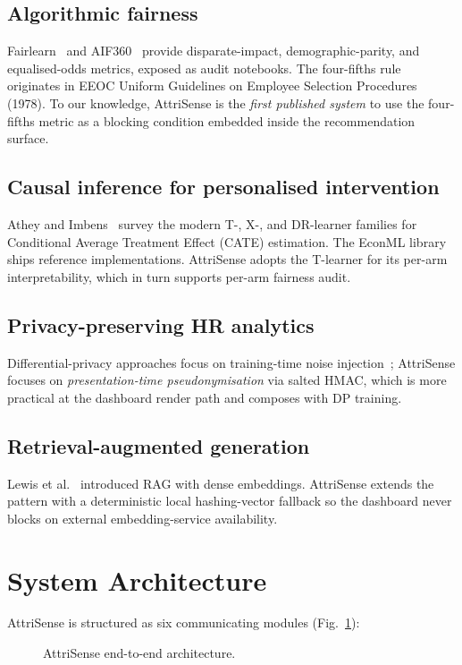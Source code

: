 \documentclass[conference]{IEEEtran}
\begin{document}
\subsection{Algorithmic fairness}
Fairlearn~\cite{fairlearn2018} and AIF360~\cite{aif360} provide
disparate-impact, demographic-parity, and equalised-odds metrics, exposed as
audit notebooks. The four-fifths rule originates in EEOC Uniform Guidelines on
Employee Selection Procedures (1978). To our knowledge, AttriSense is the
\emph{first published system} to use the four-fifths metric as a blocking
condition embedded inside the recommendation surface.

\subsection{Causal inference for personalised intervention}
Athey and Imbens~\cite{athey2019cate} survey the modern T-, X-, and DR-learner
families for Conditional Average Treatment Effect (CATE) estimation. The
EconML library~\cite{econml2019} ships reference implementations. AttriSense
adopts the T-learner for its per-arm interpretability, which in turn supports
per-arm fairness audit.

\subsection{Privacy-preserving HR analytics}
Differential-privacy approaches focus on training-time noise
injection~\cite{dwork2014algorithmic}; AttriSense focuses on
\emph{presentation-time pseudonymisation} via salted HMAC, which is more
practical at the dashboard render path and composes with DP training.

\subsection{Retrieval-augmented generation}
Lewis et al.~\cite{lewis2020rag} introduced RAG with dense embeddings.
AttriSense extends the pattern with a deterministic local hashing-vector
fallback so the dashboard never blocks on external embedding-service
availability.

\section{System Architecture}
\label{sec:arch}

AttriSense is structured as six communicating modules
(Fig.~\ref{fig:arch}):

\begin{figure}[!t]
\centering
{}
\caption{AttriSense end-to-end architecture.}
\label{fig:arch}
\end{figure}
\end{document}
